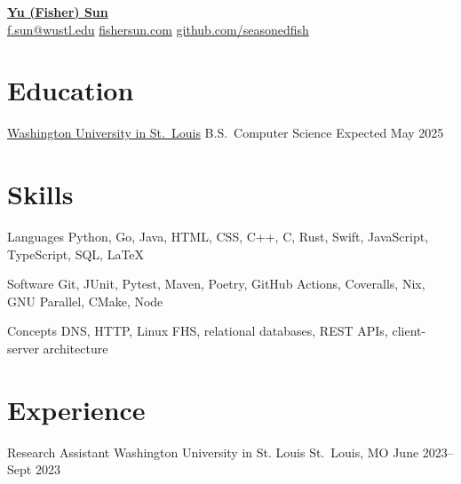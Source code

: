 \begin{center}
    {\href{}{\textbf{\Large Yu (Fisher) Sun}}} 
    \\ \vspace{5pt} 
    \href{mailto:f.sun@wustl.edu}{f.sun@wustl.edu}
    \hspace{28pt}
    \href{https://www.fishersun.com}{fishersun.com}
    \hspace{28pt}
    \href{http://github.com/seasonedfish}{github.com/seasonedfish}
\end{center}

\vspace{-20pt}
\section{Education}
\BeginSubsectionList        
    \NewSchool
        {\href{https://wustl.edu/}{Washington University in St.\ Louis}}
        {B.S.\ Computer Science}
        {Expected May 2025}

    \vspace{2.75pt}

  \EndSubsectionList

\vspace{-20pt}
\section{Skills}
    \BeginSubsectionList        
        \NewSkillCategory
            {Languages}
            {Python, Go, Java, HTML, CSS, C++, C, Rust, Swift, JavaScript, TypeScript, SQL, \LaTeX}

        \vspace{2.75pt}
        \NewSkillCategory
            {Software}
            {Git, JUnit, Pytest, Maven, Poetry, GitHub Actions, Coveralls, Nix, GNU Parallel, CMake, Node}
        
        \vspace{2.75pt}
        \NewSkillCategory
            {Concepts}
            {DNS, HTTP, Linux FHS, relational databases, REST APIs, client-server architecture}
  \EndSubsectionList

\vspace{-20pt}
\section{Experience}    
    \BeginSubsectionList        
        \NewJob
            {Research Assistant}
            {{Washington University in St. Louis}}
            {St.\ Louis, MO}
            {June 2023--Sept 2023}
            
